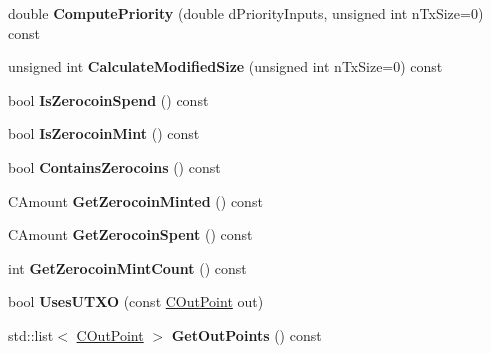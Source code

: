 \begin{DoxyCompactItemize}
\item 
\mbox{\label{class_c_transaction_adccb264c374e4ad57e699947540256f8}} 
double {\bfseries Compute\+Priority} (double d\+Priority\+Inputs, unsigned int n\+Tx\+Size=0) const
\item 
\mbox{\label{class_c_transaction_a001aa818efad11751db060dd447dc28b}} 
unsigned int {\bfseries Calculate\+Modified\+Size} (unsigned int n\+Tx\+Size=0) const
\item 
\mbox{\label{class_c_transaction_a4cda5603795c5f9179d4c8bd43f809cd}} 
bool {\bfseries Is\+Zerocoin\+Spend} () const
\item 
\mbox{\label{class_c_transaction_ab91efb1c2312e6feeecfbbfff11abbb1}} 
bool {\bfseries Is\+Zerocoin\+Mint} () const
\item 
\mbox{\label{class_c_transaction_a613051e8e5651a7500cb455f37dd1116}} 
bool {\bfseries Contains\+Zerocoins} () const
\item 
\mbox{\label{class_c_transaction_a1af92675c3c7414013cc435bfb73f1e4}} 
C\+Amount {\bfseries Get\+Zerocoin\+Minted} () const
\item 
\mbox{\label{class_c_transaction_a531f3c53fe315296726dcdbf0b22f1dc}} 
C\+Amount {\bfseries Get\+Zerocoin\+Spent} () const
\item 
\mbox{\label{class_c_transaction_ad685ade63504acb100d26535037a7ed2}} 
int {\bfseries Get\+Zerocoin\+Mint\+Count} () const
\item 
\mbox{\label{class_c_transaction_a332488544b143d4409d0ce50acaa80b6}} 
bool {\bfseries Uses\+U\+T\+XO} (const \mbox{\hyperlink{class_c_out_point}{C\+Out\+Point}} out)
\item 
\mbox{\label{class_c_transaction_ac3041c099eb8b4e019c26468099dcdb5}} 
std\+::list$<$ \mbox{\hyperlink{class_c_out_point}{C\+Out\+Point}} $>$ {\bfseries Get\+Out\+Points} () const
\item 
\mbox{\label{class_c_transaction_a96256e8ac1bf79ad9c057e48c41132dd}} 

\end{DoxyCompactItemize}
